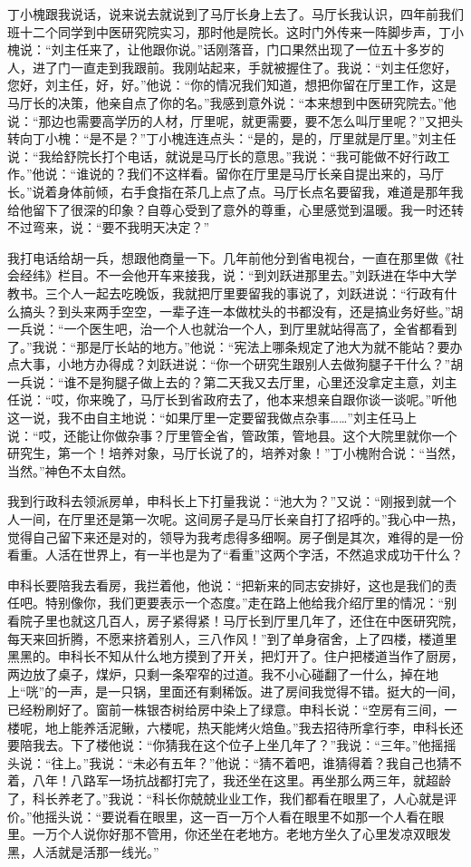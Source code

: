 \documentclass[12pt,oneside]{book}
\begin{document}
丁小槐跟我说话，说来说去就说到了马厅长身上去了。马厅长我认识，四年前我们班十二个同学到中医研究院实习，那时他是院长。这时门外传来一阵脚步声，丁小槐说：``刘主任来了，让他跟你说。''话刚落音，门口果然出现了一位五十多岁的人，进了门一直走到我跟前。我刚站起来，手就被握住了。我说：``刘主任您好，您好，刘主任，好，好。''他说：``你的情况我们知道，想把你留在厅里工作，这是马厅长的决策，他亲自点了你的名。''我感到意外说：``本来想到中医研究院去。''他说：``那边也需要高学历的人材，厅里呢，就更需要，要不怎么叫厅里呢？''又把头转向丁小槐：``是不是？''丁小槐连连点头：``是的，是的，厅里就是厅里。''刘主任说：``我给舒院长打个电话，就说是马厅长的意思。''我说：``我可能做不好行政工作。''他说：``谁说的？我们不这样看。留你在厅里是马厅长亲自提出来的，马厅长。''说着身体前倾，右手食指在茶几上点了点。马厅长点名要留我，难道是那年我给他留下了很深的印象？自尊心受到了意外的尊重，心里感觉到温暖。我一时还转不过弯来，说：``要不我明天决定？''

我打电话给胡一兵，想跟他商量一下。几年前他分到省电视台，一直在那里做《社会经纬》栏目。不一会他开车来接我，说：``到刘跃进那里去。''刘跃进在华中大学教书。三个人一起去吃晚饭，我就把厅里要留我的事说了，刘跃进说：``行政有什么搞头？到头来两手空空，一辈子连一本做枕头的书都没有，还是搞业务好些。''胡一兵说：``一个医生吧，治一个人也就治一个人，到厅里就站得高了，全省都看到了。''我说：``那是厅长站的地方。''他说：``宪法上哪条规定了池大为就不能站？要办点大事，小地方办得成？刘跃进说：``你一个研究生跟别人去做狗腿子干什么？''胡一兵说：``谁不是狗腿子做上去的？第二天我又去厅里，心里还没拿定主意，刘主任说：``哎，你来晚了，马厅长到省政府去了，他本来想亲自跟你谈一谈呢。''听他这一说，我不由自主地说：``如果厅里一定要留我做点杂事\ldots\ldots{}''刘主任马上说：``哎，还能让你做杂事？厅里管全省，管政策，管地县。这个大院里就你一个研究生，第一个！培养对象，马厅长说了的，培养对象！''丁小槐附合说：``当然，当然。''神色不太自然。

我到行政科去领派房单，申科长上下打量我说：``池大为？''又说：``刚报到就一个人一间，在厅里还是第一次呢。这间房子是马厅长亲自打了招呼的。''我心中一热，觉得自己留下来还是对的，领导为我考虑得多细啊。房子倒是其次，难得的是一份看重。人活在世界上，有一半也是为了``看重''这两个字活，不然追求成功干什么？

申科长要陪我去看房，我拦着他，他说：``把新来的同志安排好，这也是我们的责任吧。特别像你，我们更要表示一个态度。''走在路上他给我介绍厅里的情况：``别看院子里也就这几百人，房子紧得紧！马厅长到厅里几年了，还住在中医研究院，每天来回折腾，不愿来挤着别人，三八作风！''到了单身宿舍，上了四楼，楼道里黑黑的。申科长不知从什么地方摸到了开关，把灯开了。住户把楼道当作了厨房，两边放了桌子，煤炉，只剩一条窄窄的过道。我不小心碰翻了一什么，掉在地上``咣''的一声，是一只锅，里面还有剩稀饭。进了房间我觉得不错。挺大的一间，已经粉刷好了。窗前一株银杏树给房中染上了绿意。申科长说：``空房有三间，一楼呢，地上能养活泥鳅，六楼呢，热天能烤火焙鱼。''我去招待所拿行李，申科长还要陪我去。下了楼他说：``你猜我在这个位子上坐几年了？''我说：``三年。''他摇摇头说：``往上。''我说：``未必有五年？''他说：``猜不着吧，谁猜得着？我自己也猜不着，八年！八路军一场抗战都打完了，我还坐在这里。再坐那么两三年，就超龄了，科长养老了。''我说：``科长你兢兢业业工作，我们都看在眼里了，人心就是评价。''他摇头说：``要说看在眼里，这一百一万个人看在眼里不如那一个人看在眼里。一万个人说你好那不管用，你还坐在老地方。老地方坐久了心里发凉双眼发黑，人活就是活那一线光。''
\end{document}
